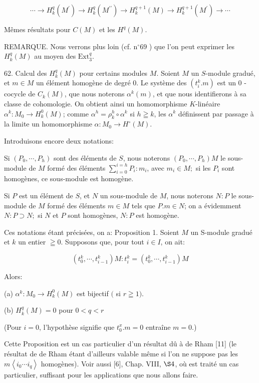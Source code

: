 $$
\cdots \rightarrow H_{k}^{q}\left(M^{\prime}\right) \rightarrow H_{k}^{q}\left(M^{\prime \prime}\right) \rightarrow H_{k}^{q+1}(M) \rightarrow H_{k}^{q+1}\left(M^{\prime}\right) \rightarrow \cdots
$$

Mêmes résultats pour $C(M)$ et les $H^{q}(M)$.

REMARQUE. Nous verrons plus loin (cf. $\mathrm{n}^{\circ} 69$ ) que l'on peut exprimer les $H_{k}^{q}(M)$ au moyen des $\mathrm{Ext}_{3}^{q}$.

62. Calcul des $H_{k}^{q}(M)$ pour certains modules $M .$ Soient $M$ un $S$-module gradué, et $m \in M$ un élément homogène de degré $0 .$ Le système des $\left(t_{i}^{k} . m\right)$ est un 0 -cocycle de $C_{k}(M)$, que nous noterons $\alpha^{k}(m)$, et que nous identifierons à sa classe de cohomologie. On obtient ainsi un homomorphisme $K$-linéaire $\alpha^{k}: M_{0} \rightarrow H_{k}^{0}(M)$; comme $\alpha^{h}=\rho_{k}^{h} \circ \alpha^{k}$ si $h \geqq k$, les $\alpha^{k}$ définissent par passage à la limite un homomorphisme $\alpha: M_{0} \rightarrow H^{\circ}(M) .$

Introduisons encore deux notations:

Si $\left(P_{0}, \cdots, P_{h}\right)$ sont des éléments de $S$, nous noterons $\left(P_{0}, \cdots, P_{h}\right) M$ le sous-module de $M$ formé des éléments $\sum_{i=0}^{i=h} P_{i}: m_{i}$, avec $m_{i} \in M ;$ si les $P_{i}$ sont homogènes, ce sous-module est homogène.

Si $P$ est un élément de $S$, et $N$ un sous-module de $M$, nous noterons $N: P$ le sous-module de $M$ formé des éléments $m \in M$ tels que $P . m \in N$; on a évidemment $N: P \supset N ;$ si $N$ et $P$ sont homogènes, $N: P$ est homogène.

Ces notations étant précisées, on a: Proposition 1. Soient $M$ un S-module gradué et $k$ un entier $\geqq 0 .$ Supposons que, pour tout $i \in I$, on ait:

$$
\left(t_{0}^{k}, \cdots, t_{i-1}^{k}\right) M: t_{i}^{k}=\left(t_{0}^{k}, \cdots, t_{i-1}^{k}\right) M
$$

Alors:

(a) $\alpha^{k}: M_{0} \rightarrow H_{k}^{0}(M)$ est bijectif $($ si $r \geqq 1)$.

(b) $H_{k}^{q}(M)=0$ pour $0<q<r$

(Pour $i=0$, l'hypothèse signifie que $t_{0}^{x} . m=0$ entraîne $m=0$.)

Cette Proposition est un cas particulier d'un résultat dû à de Rham [11] (le résultat de de Rham étant d'ailleurs valable même si l'on ne suppose pas les $m\left\langle i_{0} \cdots i_{q}\right\rangle$ homogènes). Voir aussi [6], Chap. VIII, $\S 4$, où est traité un cas particulier, suffisant pour les applications que nous allons faire.

